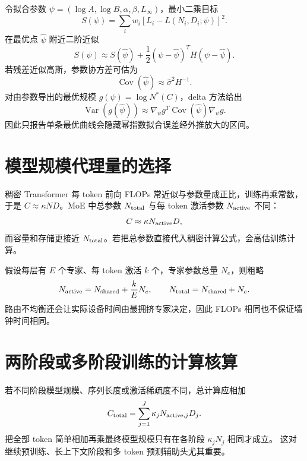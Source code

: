 \documentclass[11pt]{article}
\numberwithin{equation}{section}
\newcommand{\1}{\mathbf{1}}
\newcommand{\Var}{\operatorname{Var}}
\newcommand{\Cov}{\operatorname{Cov}}
\begin{document}
令拟合参数
$\psi=(\log A,\log B,\alpha,\beta,L_\infty)$，最小二乘目标
\begin{equation}
 S(\psi)=\sum_i w_i[L_i-L(N_i,D_i;\psi)]^2.
\end{equation}
在最优点 $\widehat\psi$ 附近二阶近似
\begin{equation}
 S(\psi)\approx S(\widehat\psi)
 +\frac12(\psi-\widehat\psi)^TH(\psi-\widehat\psi).
\end{equation}
若残差近似高斯，参数协方差可估为
\begin{equation}
 \Cov(\widehat\psi)\approx\widehat\sigma^2H^{-1}.
\end{equation}
对由参数导出的最优规模 $g(\psi)=\log N^*(C)$，delta 方法给出
\begin{equation}
 \Var(g(\widehat\psi))
 \approx\nabla_\psi g^T\Cov(\widehat\psi)\nabla_\psi g.
\end{equation}
因此只报告单条最优曲线会隐藏幂指数拟合误差经外推放大的区间。

\section{模型规模代理量的选择}

稠密 Transformer 每 token 前向 FLOPs 常近似与参数量成正比，训练再乘常数，
于是 $C\approx\kappa ND$。MoE 中总参数 $N_{\rm total}$ 与每 token 激活参数
$N_{\rm active}$ 不同：
\begin{equation}
 C\approx\kappa N_{\rm active}D,
\end{equation}
而容量和存储更接近 $N_{\rm total}$。若把总参数直接代入稠密计算公式，会高估训练计算。

假设每层有 $E$ 个专家、每 token 激活 $k$ 个，专家参数总量 $N_e$，则粗略
\begin{equation}
 N_{\rm active}=N_{\rm shared}+\frac{k}{E}N_e,\qquad
 N_{\rm total}=N_{\rm shared}+N_e.
\end{equation}
路由不均衡还会让实际设备时间由最拥挤专家决定，因此 FLOPs 相同也不保证墙钟时间相同。

\section{两阶段或多阶段训练的计算核算}

若不同阶段模型规模、序列长度或激活稀疏度不同，总计算应相加
\begin{equation}
 C_{\rm total}=\sum_{j=1}^{J}\kappa_jN_{{\rm active},j}D_j.
\end{equation}
把全部 token 简单相加再乘最终模型规模只有在各阶段 $\kappa_jN_j$ 相同才成立。
这对继续预训练、长上下文阶段和多 token 预测辅助头尤其重要。
\end{document}
